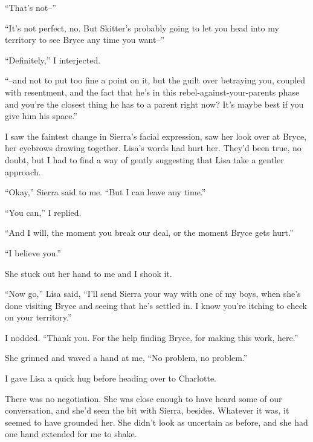 ``That's not--''



``It's not perfect, no.  But Skitter's probably going to let you head into my territory to see Bryce any time you want--''



``Definitely,'' I interjected.



``--and not to put too fine a point on it, but the guilt over betraying you, coupled with resentment, and the fact that he's in this rebel-against-your-parents phase and you're the closest thing he has to a parent right now? It's maybe best if you give him his space.''



I saw the faintest change in Sierra's facial expression, saw her look over at Bryce, her eyebrows drawing together.  Lisa's words had hurt her.  They'd been true, no doubt, but I had to find a way of gently suggesting that Lisa take a gentler approach.



``Okay,'' Sierra said to me.  ``But I can leave any time.''



``You can,'' I replied.



``And I will, the moment you break our deal, or the moment Bryce gets hurt.''



``I believe you.''



She stuck out her hand to me and I shook it.



``Now go,'' Lisa said, ``I'll send Sierra your way with one of my boys, when she's done visiting Bryce and seeing that he's settled in.  I know you're itching to check on your territory.''



I nodded.  ``Thank you.  For the help finding Bryce, for making this work, here.''



She grinned and waved a hand at me, ``No problem, no problem.''



I gave Lisa a quick hug before heading over to Charlotte.



There was no negotiation.  She was close enough to have heard some of our conversation, and she'd seen the bit with Sierra, besides.  Whatever it was, it seemed to have grounded her.  She didn't look as uncertain as before, and she had one hand extended for me to shake.



